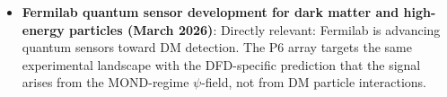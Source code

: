 \documentclass[11pt]{article}
\theoremstyle{definition}
\theoremstyle{remark}
\begin{document}
\begin{itemize}
\item \textbf{Fermilab quantum sensor development for dark matter and
  high-energy particles (March 2026)}:
  Directly relevant: Fermilab is advancing quantum sensors toward DM
  detection. The P6 array targets the same experimental landscape with
  the DFD-specific prediction that the signal arises from the MOND-regime
  $\psi$-field, not from DM particle interactions.

\end{itemize}
\end{document}
